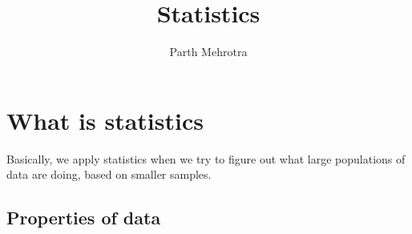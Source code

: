 \documentclass{article}
\title{Statistics}
\author{Parth Mehrotra}
\begin{document}
	\maketitle
	\newpage

	\section{What is statistics} 
		Basically, we apply statistics when we try to figure out what large populations of data are doing, based on smaller samples.
		\subsection{Properties of data}
			
\end{document}
